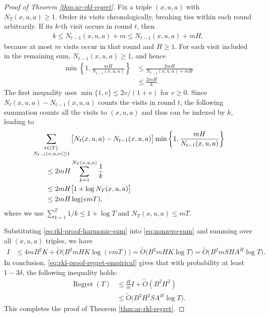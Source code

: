\documentclass[11pt]{article}
\begin{document}
\begin{proof}[Proof of Theorem \ref{thm:ar-rkl-regret}]
Fix a triple $(x,u,a)$ with $N_T(x,u,a)\geq1$.
Order its visits chronologically, breaking ties within each round
arbitrarily. If its $k$-th visit occurs in round $t$, then
\begin{align*}
    k
    \leq N_{t-1}(x,u,a)+m
    \leq N_{t-1}(x,u,a)+mH,
\end{align*}
because at most $m$ visits occur in that round and $H\geq1$.
For each visit included in the remaining sum,
$N_{t-1}(x,u,a)\geq1$, and hence
\begin{align*}
    \min\left\{
        1,\frac{mH}{N_{t-1}(x,u,a)}
    \right\}
    &\leq
    \frac{2mH}{N_{t-1}(x,u,a)+mH}\\
    &\leq
    \frac{2mH}{k}.
\end{align*}
The first inequality uses
$\min\{1,v\}\leq2v/(1+v)$ for $v\geq0$. Since $N_t(x,u,a)-N_{t-1}(x,u,a)$ counts the visits in round $t$, the following summation counts all the visits to $(x,u,a)$ and thus can be indexed by $k$, leading to
\begin{align}
    &\sum_{\substack{t\in[T]:\\
        N_{t-1}(x,u,a)\geq1}}
    \big[N_t(x,u,a)-N_{t-1}(x,u,a)\big]
    \min\bigg\{
        1,\frac{mH}{N_{t-1}(x,u,a)}
    \bigg\}\notag\\
    &\qquad\leq
    2mH\sum_{k=1}^{N_T(x,u,a)}\frac1k\notag\\
    &\qquad\leq
    2mH\bigl[1+\log N_T(x,u,a)\bigr] \notag\\
    & \qquad 
    \leq
    2mH\log(emT),
    \label{eq:rkl-proof-harmonic-sum}
\end{align}
where we use $\sum_{k=1}^T 1/k \le 1 + \log T$ and $N_T(x,u,a)\leq mT$.

Substituting \eqref{eq:rkl-proof-harmonic-sum} into \eqref{eq:nonzero-sum} and summing over all $(x,u,a)$ triples, we have
\begin{align*}
    I
    &\leq
    4mB^2K
    +
    \widetilde O\bigl(B^2mHK\log(emT)\bigr)=
    \widetilde O\bigl(B^2mHK \log T\bigr) = \tilde O\bigl(B^2mSHA^H \log T\bigr).
\end{align*}
In conclusion, \eqref{eq:rkl-proof-regret-empirical} gives that with probability at least $1-3\delta$, the following inequality holds:
\begin{align*}
    \operatorname{Regret}(T) &\le \frac{H}{m} I + \tilde O(B^2H^2)\\
    &\le \tilde O\big(B^2H^2SA^H \log T\big).
\end{align*}
This completes the proof of Theorem \ref{thm:ar-rkl-regret}.
\end{proof}
\end{document}

